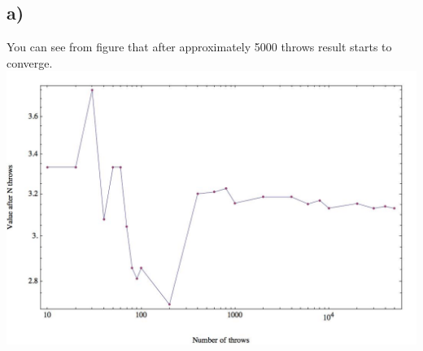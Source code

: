 \documentclass[12pt]{article}
\numberwithin{equation}{section}
\numberwithin{table}{section}
\begin{document}
\subsection*{a)}You can see from figure that after approximately 5000 throws result starts to converge.
\includegraphics[width=15cm]{mc_p01_b.jpg}
\end{document}
